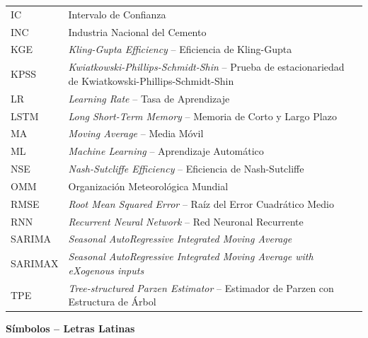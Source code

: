 \begin{longtable}{p{3.2cm} p{10.8cm}}
IC      & Intervalo de Confianza \\[3pt]
INC     & Industria Nacional del Cemento \\[3pt]
KGE     & \textit{Kling-Gupta Efficiency} -- Eficiencia de Kling-Gupta \\[3pt]
KPSS    & \textit{Kwiatkowski-Phillips-Schmidt-Shin} -- Prueba de estacionariedad de Kwiatkowski-Phillips-Schmidt-Shin \\[3pt]
LR      & \textit{Learning Rate} -- Tasa de Aprendizaje \\[3pt]
LSTM    & \textit{Long Short-Term Memory} -- Memoria de Corto y Largo Plazo \\[3pt]
MA      & \textit{Moving Average} -- Media Móvil \\[3pt]
ML      & \textit{Machine Learning} -- Aprendizaje Automático \\[3pt]
NSE     & \textit{Nash-Sutcliffe Efficiency} -- Eficiencia de Nash-Sutcliffe \\[3pt]
OMM     & Organización Meteorológica Mundial \\[3pt]
RMSE    & \textit{Root Mean Squared Error} -- Raíz del Error Cuadrático Medio \\[3pt]
RNN     & \textit{Recurrent Neural Network} -- Red Neuronal Recurrente \\[3pt]
SARIMA  & \textit{Seasonal AutoRegressive Integrated Moving Average} \\[3pt]
SARIMAX & \textit{Seasonal AutoRegressive Integrated Moving Average with eXogenous inputs} \\[3pt]
TPE     & \textit{Tree-structured Parzen Estimator} -- Estimador de Parzen con Estructura de Árbol \\[3pt]
\end{longtable}

\vspace{0.5cm}

\clearpage
\noindent\textbf{Símbolos -- Letras Latinas}

\vspace{0.25cm}

